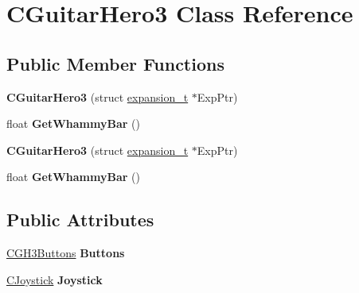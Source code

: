 \hypertarget{class_c_guitar_hero3}{\section{C\-Guitar\-Hero3 Class Reference}
\label{class_c_guitar_hero3}
}
\subsection*{Public Member Functions}
\begin{DoxyCompactItemize}
\item 
\hypertarget{class_c_guitar_hero3_afbef4e83211e146d2aef1064fcc24bb7}{{\bfseries C\-Guitar\-Hero3} (struct \hyperlink{structexpansion__t}{expansion\-\_\-t} $\ast$Exp\-Ptr)}\label{class_c_guitar_hero3_afbef4e83211e146d2aef1064fcc24bb7}

\item 
\hypertarget{class_c_guitar_hero3_ae4066620ae4ba771306e6439968504e6}{float {\bfseries Get\-Whammy\-Bar} ()}\label{class_c_guitar_hero3_ae4066620ae4ba771306e6439968504e6}

\item 
\hypertarget{class_c_guitar_hero3_afbef4e83211e146d2aef1064fcc24bb7}{{\bfseries C\-Guitar\-Hero3} (struct \hyperlink{structexpansion__t}{expansion\-\_\-t} $\ast$Exp\-Ptr)}\label{class_c_guitar_hero3_afbef4e83211e146d2aef1064fcc24bb7}

\item 
\hypertarget{class_c_guitar_hero3_ae4066620ae4ba771306e6439968504e6}{float {\bfseries Get\-Whammy\-Bar} ()}\label{class_c_guitar_hero3_ae4066620ae4ba771306e6439968504e6}

\end{DoxyCompactItemize}
\subsection*{Public Attributes}
\begin{DoxyCompactItemize}
\item 
\hypertarget{class_c_guitar_hero3_a70e8e38de7e281c5a7af18cf09747d48}{\hyperlink{class_c_g_h3_buttons}{C\-G\-H3\-Buttons} {\bfseries Buttons}}\label{class_c_guitar_hero3_a70e8e38de7e281c5a7af18cf09747d48}

\item 
\hypertarget{class_c_guitar_hero3_a2a91b61b396cf329e979a66c729c3768}{\hyperlink{class_c_joystick}{C\-Joystick} {\bfseries Joystick}}\label{class_c_guitar_hero3_a2a91b61b396cf329e979a66c729c3768}

\end{DoxyCompactItemize}
